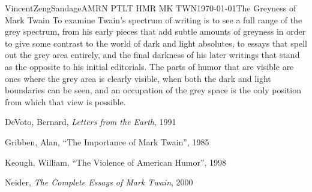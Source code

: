 \documentclass{article}[12pt]
\begin{document}
\begin{mla}{Vincent}{Zeng}{Sandage}{AMRN PTLT HMR MK TWN}{\today}{The Greyness of Mark Twain}
To examine Twain's spectrum of writing is to see a full range of the grey spectrum, from his early pieces that add subtle amounts of greyness in order to give some contrast to the world of dark and light absolutes, to essays that spell out the grey area entirely, and the final darkness of his later writings that stand as the opposite to his initial editorials. The parts of humor that are visible are ones where the grey area is clearly visible, when both the dark and light boundaries can be seen, and an occupation of the grey space is the only position from which that view is possible.
\begin{workscited}

	\bibindent 
	DeVoto, Bernard, \textit{Letters from the Earth}, 1991

	\bibindent 
	Gribben, Alan, ``The Importance of Mark Twain'', 1985
	
	\bibindent 
	Keough, William, ``The Violence of American Humor'', 1998
	
	\bibindent 
	Neider, \textit{The Complete Essays of Mark Twain}, 2000
	
\end{workscited}
\end{mla}
\end{document}
